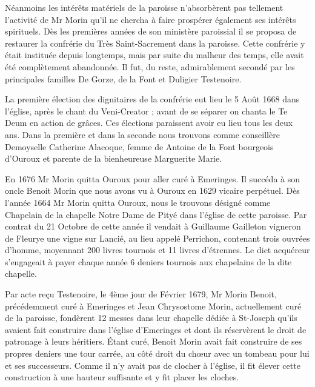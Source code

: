 Néanmoins les intérêts matériels de la paroisse n'absorbèrent pas tellement l'activité de Mr Morin qu'il ne chercha à faire prospérer également ses intérêts spirituels. Dès les premières années de son ministère paroissial il se proposa de restaurer la confrérie du Très Saint-Sacrement dans la paroisse. Cette confrérie y était instituée depuis longtemps, mais par suite du malheur des temps, elle avait été complètement abandonnée. Il fut, du reste, admirablement secondé par les principales familles De Gorze, de la Font et Duligier Testenoire.

La première élection des dignitaires de la confrérie eut lieu le 5 Août 1668 dans l'église, après le chant du Veni-Creator ; avant de se séparer on chanta le Te Deum en action de grâces. Ces élections paraissent avoir eu lieu tous les deux ans. Dans la première et dans
la seconde nous trouvons comme conseillère Demoyselle Catherine Alacoque, femme de Antoine de la Font bourgeois d'Ouroux et parente de la bienheureuse Marguerite Marie.

En 1676 Mr Morin quitta Ouroux pour aller curé à Emeringes. Il succéda à son oncle Benoit Morin que nous avons vu à Ouroux en 1629 vicaire perpétuel. Dès l'année 1664 Mr Morin quitta Ouroux, nous le trouvons désigné comme Chapelain de la chapelle Notre Dame de Pityé dans l'église de cette paroisse. Par contrat du 21 Octobre de cette année il vendait à Guillaume Gailleton vigneron de Fleurye une vigne sur Lancié, au lieu appelé Perrichon, contenant trois ouvrées d'homme, moyennant 200 livres tournois et 11 livres d'étrennes. Le dict acquéreur s'engageait à payer chaque année 6 deniers tournois aux chapelains de la dite chapelle.

Par acte reçu Testenoire, le 4ème jour de Février 1679, Mr Morin Benoit, précédemment curé à Emeringes et Jean Chrysostome Morin, actuellement curé de la paroisse, fondèrent 12 messes dans leur chapelle dédiée à St-Joseph qu'ils avaient fait construire dans l'église d'Emeringes et dont ils réservèrent le droit de patronage à leurs héritiers. Étant curé, Benoit Morin avait fait construire de ses propres deniers une tour carrée, au côté droit du chœur avec un tombeau pour lui et ses successeurs. Comme il n'y avait pas de clocher à l'église, il fit élever cette construction à une hauteur suffisante et y fit placer les cloches.

